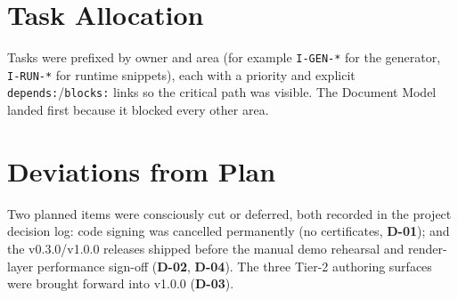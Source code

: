 \section{Task Allocation}
Tasks were prefixed by owner and area (for example \texttt{I-GEN-*} for the
generator, \texttt{I-RUN-*} for runtime snippets), each with a priority and
explicit \texttt{depends:}/\texttt{blocks:} links so the critical path was
visible. The Document Model landed first because it blocked every other area.

\section{Deviations from Plan}
Two planned items were consciously cut or deferred, both recorded in the project
decision log: code signing was cancelled permanently (no certificates,
\textbf{D-01}); and the v0.3.0/v1.0.0 releases shipped before the manual demo
rehearsal and render-layer performance sign-off (\textbf{D-02}, \textbf{D-04}).
The three Tier-2 authoring surfaces were brought forward into v1.0.0
(\textbf{D-03}). %
